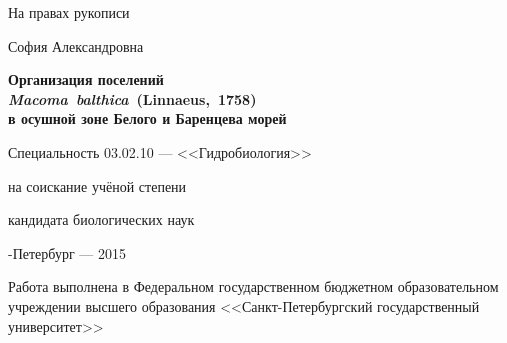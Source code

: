 \def\hrf#1{\hbox to#1{\hrulefill}} %
\newcommand{\sfs}{\fontsize{14pt}{15pt}\selectfont}
\sfs %
\thispagestyle{empty}

\vspace{10mm}
\begin{flushright}
	\Large На правах рукописи 
\end{flushright}

\vspace{30mm}
\begin{center}
{\Large{} София Александровна}
\end{center}

\vspace{30mm}
\begin{center}
{\bf \LARGE Организация поселений \\ \textit{ Macoma~balthica}~(Linnaeus,~1758) \\ в осушной зоне Белого и Баренцева морей
\par}

\vspace{30mm}
{\Large
Специальность 03.02.10 --- <<Гидробиология>>
}

\vspace{15mm}
\par
{} на соискание учёной степени\par
кандидата биологических наук
\end{center}

\vspace{40mm}
\begin{center}
{-Петербург --- 2015}
\end{center}

\newpage
\thispagestyle{empty}
\noindent Работа выполнена в Федеральном государственном бюджетном образовательном учреждении высшего образования <<Санкт-Петербургский  государственный  университет>>

